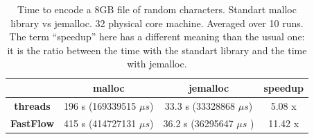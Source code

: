 \documentclass[12pt, letterpaper]{article}
\begin{document}
\begin{table}[h]
    \begin{center}
    \begin{tabular}{c c c c}
        & \textbf{malloc} & \textbf{jemalloc} & speedup\\
        \hline
        \textbf{threads} & 196 s (169339515 $\mu s$)  & 33.3 s  (33328868 $\mu s$) & 5.08 x \\
        \hline
        \textbf{FastFlow} &  415 s  (414727131 $\mu s$) & 36.2 s (36295647 $\mu s$ ) & 11.42 x \\
        \hline
    \end{tabular}
    \caption{Time to encode a 8GB file of random characters. Standart malloc library vs jemalloc. 32 physical core machine. Averaged over 10 runs. The term ``speedup'' here has a different meaning than the usual one: it is the ratio between the time with the standart library and the time with jemalloc.}    
    \label{tab:jemalloc}
    \end{center}
    \end{table}






\newpage \FloatBarrier


\end{document}
